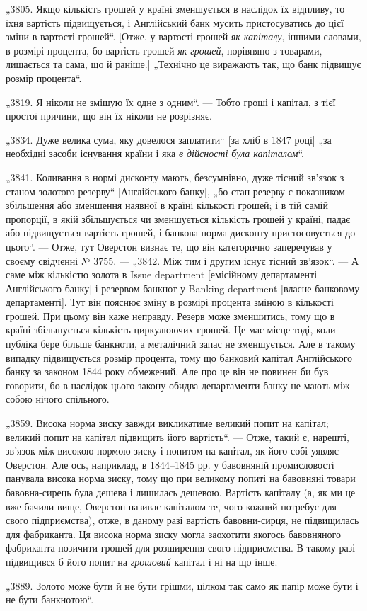 
„3805. Якщо кількість грошей у країні зменшується в наслідок
їх відпливу, то їхня вартість підвищується, і Англійський банк
мусить пристосуватись до цієї зміни в вартості грошей“. [Отже, у вартості грошей \emph{як капіталу}, іншими
словами, в розмірі процента, бо вартість грошей \emph{як грошей}, порівняно з товарами,
лишається та сама, що й раніше.] „Технічно це виражають так,
що банк підвищує розмір процента“.

„3819. Я ніколи не змішую їх одне з одним“. — Тобто гроші
і капітал, з тієї простої причини, що він їх ніколи не розрізняє.

„3834. Дуже велика сума, яку довелося заплатити“ [за хліб
в 1847 році] „за необхідні засоби існування країни і яка \emph{в дійсності була капіталом}“.

„3841. Коливання в нормі дисконту мають, безсумнівно, дуже
тісний зв’язок з станом золотого резерву“ [Англійського
банку], „бо стан резерву є показником збільшення або зменшення
наявної в країні кількості грошей; і в тій самій пропорції, в якій
збільшується чи зменшується кількість грошей у країні, падає або
підвищується вартість грошей, і банкова норма дисконту пристосовується до цього“. — Отже, тут
Оверстон визнає те, що він
категорично заперечував у своєму свідченні № 3755. — „3842. Між
тим і другим існує тісний зв’язок“. — А саме між кількістю золота
в Issue department [емісійному департаменті Англійського банку]
і резервом банкнот у Banking department [власне банковому департаменті]. Тут він пояснює зміну в
розмірі процента зміною в кількості грошей. При цьому він каже неправду. Резерв може зменшитись,
тому що в країні збільшується кількість циркулюючих грошей.
Це має місце тоді, коли публіка бере більше банкноти, а металічний запас не зменшується. Але в
такому випадку підвищується
розмір процента, тому що банковий капітал Англійського банку
за законом 1844 року обмежений. Але про це він не повинен
би був говорити, бо в наслідок цього закону обидва департаменти банку не мають між собою нічого
спільного.

„3859. Висока норма зиску завжди викликатиме великий попит
на капітал; великий попит на капітал підвищить його вартість“. — Отже, такий є, нарешті, зв’язок між
високою нормою
зиску і попитом на капітал, як його собі уявляє Оверстон. Але
ось, наприклад, в 1844--1845 рр. у бавовняній промисловості
панувала висока норма зиску, тому що при великому попиті на
бавовняні товари бавовна-сирець була дешева і лишилась дешевою. Вартість капіталу (а, як ми це вже
бачили вище, Оверстон називає капіталом те, чого кожний потребує для свого
підприємства), отже, в даному разі вартість бавовни-сирця, не
підвищилась для фабриканта. Ця висока норма зиску могла
заохотити якогось бавовняного фабриканта позичити грошей для
розширення свого підприємства. В такому разі підвищився б його
попит на \emph{грошовий} капітал і ні на що інше.

„3889. Золото може бути й не бути грішми, цілком так само
як папір може бути і не бути банкнотою“.

